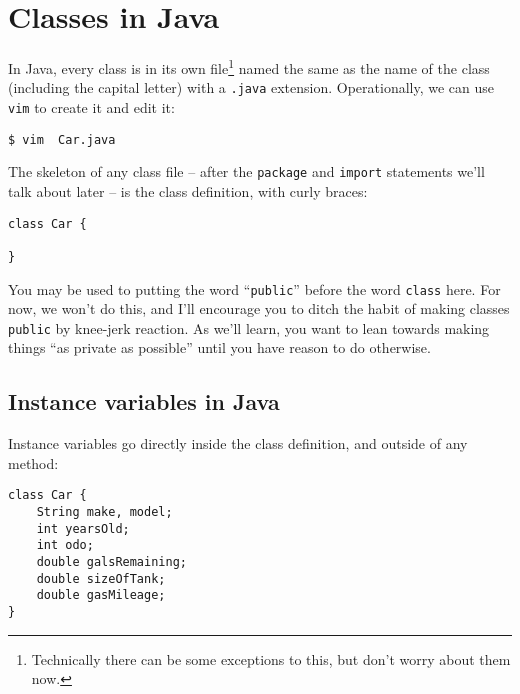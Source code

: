 \section{Classes in Java}

In Java, every class is in its own file\footnote{Technically there can be
some exceptions to this, but don't worry about them now.} named the same as
the name of the class (including the capital letter) with a \texttt{.java}
extension. Operationally, we can use \texttt{vim} to create it and edit it:

\begin{verbatim}
$ vim  Car.java
\end{verbatim}

The skeleton of any class file -- after the \texttt{package} and
\texttt{import} statements we'll talk about later -- is the class definition,
with curly braces:

\begin{Verbatim}[samepage=true,fontsize=\footnotesize,frame=single]
class Car {
    
}
\end{Verbatim}

You may be used to putting the word ``\texttt{public}'' before the word
\texttt{class} here. For now, we won't do this, and I'll encourage you to
ditch the habit of making classes \texttt{public} by knee-jerk reaction. As
we'll learn, you want to lean towards making things ``as private as possible''
until you have reason to do otherwise.

\subsection{Instance variables in Java}

Instance variables go directly inside the class definition, and outside of any
method:

\begin{Verbatim}[samepage=true,fontsize=\footnotesize,frame=single]
class Car {
    String make, model;
    int yearsOld;
    int odo;
    double galsRemaining;
    double sizeOfTank;
    double gasMileage;    
}
\end{Verbatim}

